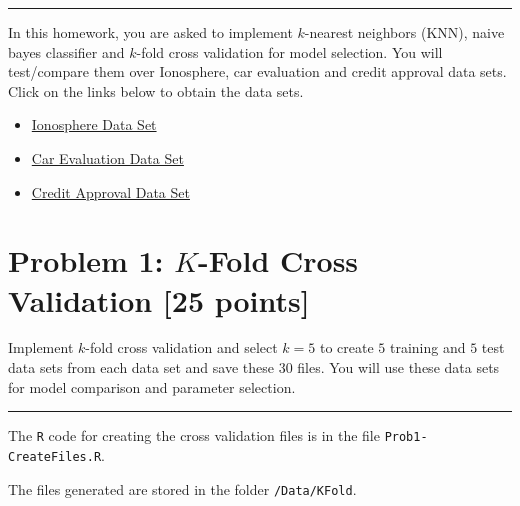 \documentclass{article}
\newcommand{\code}[1]{\texttt{#1}}
\newcommand{\sep}{\begin{center}\textcolor{gray}{\rule{\textwidth}{0.75pt}}\end{center}}
\begin{document}
\vspace{75pt}
\sep 
\vspace{10pt}

In this homework, you are asked to implement $k$-nearest neighbors (KNN), naive bayes classifier and $k$-fold cross validation for model selection. You will test/compare them over Ionosphere, car evaluation and credit approval data sets. Click on the links below to obtain the data sets.

\begin{itemize}
\item \href{https://archive.ics.uci.edu/ml/datasets/ionosphere}{
Ionosphere Data Set }
\item \href{https://archive.ics.uci.edu/ml/datasets/car+evaluation}{Car Evaluation Data Set}
\item \href{https://archive.ics.uci.edu/ml/datasets/Credit+Approval}{Credit Approval Data Set }
\end{itemize}


%

\newpage
\section*{Problem 1: $K$-Fold Cross Validation [25 points]}

Implement $k$-fold cross validation and select $k=5$ to create $5$ training and $5$ test data sets from each data set and save these $30$ files. You will use these data sets for model comparison and parameter selection.
\sep 


The \code{R} code for creating the cross validation files is in the file \code{Prob1-CreateFiles.R}.

The files generated are stored in the folder \code{/Data/KFold}.




























%
\end{document}
